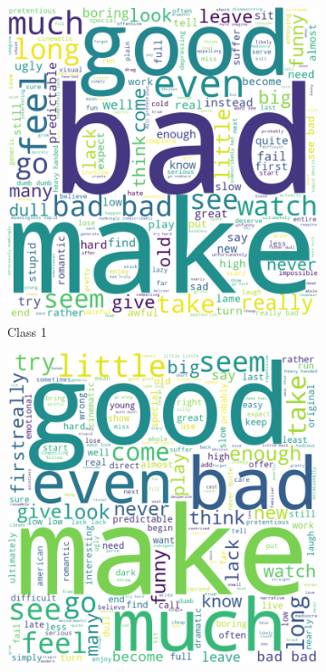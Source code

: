 \documentclass[10pt, a4paper]{article}
\begin{document}
\begin{figure}[h]
     \centering
     \begin{subfigure}[b]{0.18\textwidth}
         \centering
         \includegraphics[width=\textwidth]{keywords1.png}
         \caption{Class 1}
         \label{fig:class1cloud}
     \end{subfigure}
     \hfill
     \begin{subfigure}[b]{0.18\textwidth}
         \centering
         \includegraphics[width=\textwidth]{keywords2.png}

\end{subfigure}
\end{figure}
\end{document}
